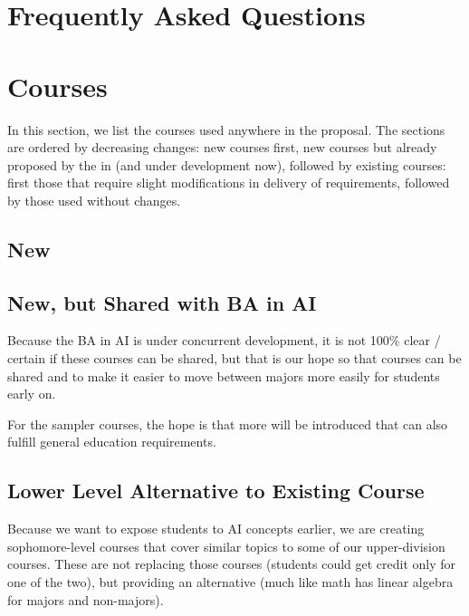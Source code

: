 \documentclass[
10pt, %
a4paper, %
oneside, %
headinclude,footinclude, %
BCOR5mm, %
]{scrartcl}
\begin{document}


\section{Frequently Asked Questions}



  \section{Courses}

In this section, we list the courses used anywhere in the proposal.  The sections are ordered by decreasing changes: new courses first, new courses but already proposed by the  in  (and under development now), followed by existing courses: first those that require slight modifications in delivery of requirements, followed by those used without changes.  

  \subsection{New}

  

  \subsection{New, but Shared with BA in AI}

  Because the BA in AI is under concurrent development, it is not 100\% clear / certain if these courses can be shared, but that is our hope so that courses can be shared and to make it easier to move between majors more easily for students early on.  

  For the sampler courses, the hope is that more will be introduced that can also fulfill general education requirements.

  

    \subsection{Lower Level Alternative to Existing Course}

    Because we want to expose students to AI concepts earlier, we are creating sophomore-level courses that cover similar topics to some of our upper-division courses.  These are not replacing those courses (students could get credit only for one of the two), but providing an alternative (much like math has linear algebra for majors and non-majors).
\end{document}
